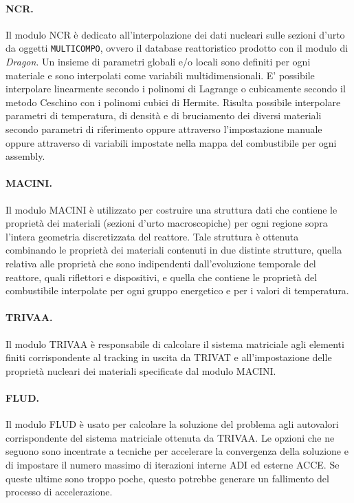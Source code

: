 \paragraph{NCR.}
Il modulo NCR è dedicato all'interpolazione dei dati nucleari sulle sezioni 
d'urto da oggetti \texttt{MULTICOMPO}, ovvero il database reattoristico prodotto con il 
modulo di \textit{Dragon}.
Un insieme di parametri globali e/o locali sono definiti per ogni materiale e 
sono interpolati come variabili multidimensionali.
E' possibile interpolare linearmente secondo i polinomi di Lagrange o 
cubicamente secondo il metodo Ceschino con i polinomi cubici di Hermite.
Risulta possibile interpolare parametri di temperatura, di densità e di 
bruciamento 
dei diversi materiali secondo parametri di riferimento oppure attraverso 
l'impostazione manuale oppure attraverso di variabili impostate nella mappa del 
combustibile per ogni assembly.
\paragraph{MACINI.}
Il modulo MACINI è utilizzato per costruire una struttura dati che contiene le 
proprietà dei materiali (sezioni d'urto macroscopiche) per ogni regione sopra 
l'intera geometria discretizzata del reattore.
Tale struttura è ottenuta combinando le proprietà dei materiali contenuti in 
due distinte strutture, quella relativa alle proprietà che sono indipendenti 
dall'evoluzione temporale del reattore, quali riflettori e dispositivi, e 
quella 
che contiene le proprietà del combustibile interpolate per ogni gruppo 
energetico e per i valori di temperatura.
\paragraph{TRIVAA.}
Il modulo TRIVAA è responsabile di calcolare il sistema matriciale agli 
elementi finiti corrispondente al tracking in uscita da TRIVAT e 
all'impostazione delle proprietà nucleari dei materiali specificate dal modulo 
MACINI.
\paragraph{FLUD.}
Il modulo FLUD è usato per calcolare la soluzione del problema agli autovalori 
corrispondente del sistema matriciale ottenuta da TRIVAA. 
Le opzioni che ne seguono sono incentrate a tecniche per accelerare la 
convergenza della soluzione e di impostare il numero massimo di iterazioni 
interne ADI ed esterne ACCE. Se queste ultime sono troppo poche, questo potrebbe generare 
un fallimento del processo di accelerazione. 
